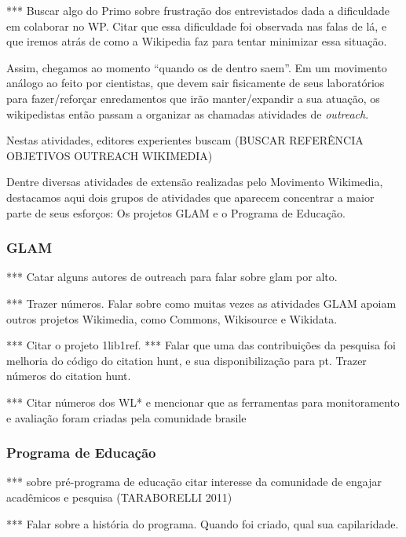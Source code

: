 *** Buscar algo do Primo sobre frustração dos entrevistados dada a dificuldade em colaborar no WP. Citar que essa dificuldade foi observada nas falas de lá, e que iremos atrás de como a Wikipedia faz para tentar minimizar essa situação.

Assim, chegamos ao momento ``quando os de dentro saem''. Em um movimento análogo ao feito por cientistas, que devem sair fisicamente de seus laboratórios para fazer/reforçar enredamentos que irão manter/expandir a sua atuação, os wikipedistas então passam a organizar as chamadas atividades de \textit{outreach}. 

Nestas atividades, editores experientes buscam (BUSCAR REFERÊNCIA OBJETIVOS OUTREACH WIKIMEDIA)

Dentre diversas atividades de extensão realizadas pelo Movimento Wikimedia, destacamos aqui dois grupos de atividades que aparecem concentrar a maior parte de seus esforços: Os projetos GLAM e o Programa de Educação.


\subsubsection{GLAM}

*** Catar alguns autores de outreach para falar sobre glam por alto.

*** Trazer números. Falar sobre como muitas vezes as atividades GLAM apoiam outros projetos Wikimedia, como Commons, Wikisource e Wikidata.

***  Citar o projeto 1lib1ref.
***  Falar que uma das contribuições da pesquisa foi melhoria do código do citation hunt, e sua disponibilização para pt. Trazer números do citation hunt.

*** Citar números dos WL* e mencionar que as ferramentas para monitoramento e avaliação foram criadas pela comunidade brasile

\subsubsection{Programa de Educação}

*** sobre pré-programa de educação citar interesse da comunidade de engajar acadêmicos e pesquisa (TARABORELLI 2011)

*** Falar sobre a história do programa. Quando foi criado, qual sua capilaridade. 

